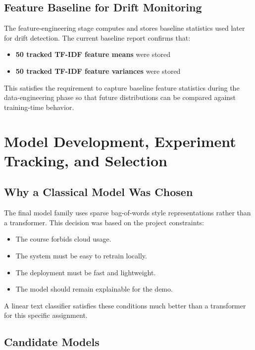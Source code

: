 \documentclass[11pt,a4paper]{article}
\begin{document}
\subsection{Feature Baseline for Drift Monitoring}

The feature-engineering stage computes and stores baseline statistics used later for drift detection. The current baseline report confirms that:

\begin{itemize}[leftmargin=1.4em]
  \item \textbf{50 tracked TF-IDF feature means} were stored
  \item \textbf{50 tracked TF-IDF feature variances} were stored
\end{itemize}

This satisfies the requirement to capture baseline feature statistics during the data-engineering phase so that future distributions can be compared against training-time behavior.

\section{Model Development, Experiment Tracking, and Selection}

\subsection{Why a Classical Model Was Chosen}

The final model family uses sparse bag-of-words style representations rather than a transformer. This decision was based on the project constraints:

\begin{itemize}[leftmargin=1.4em]
  \item The course forbids cloud usage.
  \item The system must be easy to retrain locally.
  \item The deployment must be fast and lightweight.
  \item The model should remain explainable for the demo.
\end{itemize}

A linear text classifier satisfies these conditions much better than a transformer for this specific assignment.

\subsection{Candidate Models}
\end{document}
